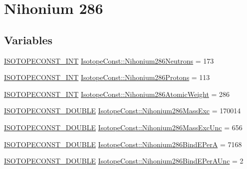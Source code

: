 \hypertarget{group___isotope_const-_nihonium-_nh286}{}\section{Nihonium 286}
\label{group___isotope_const-_nihonium-_nh286}
\subsection*{Variables}
\begin{DoxyCompactItemize}
\item 
\mbox{\hyperlink{group___isotope_const-_macros_ga5f18360b3e99483a35c32d789e62621c}{I\+S\+O\+T\+O\+P\+E\+C\+O\+N\+S\+T\+\_\+\+I\+NT}} \mbox{\hyperlink{group___isotope_const-_nihonium-_nh286_gad570360409f83cc1f981cc12b510ae24}{Isotope\+Const\+::\+Nihonium286\+Neutrons}} = 173
\item 
\mbox{\hyperlink{group___isotope_const-_macros_ga5f18360b3e99483a35c32d789e62621c}{I\+S\+O\+T\+O\+P\+E\+C\+O\+N\+S\+T\+\_\+\+I\+NT}} \mbox{\hyperlink{group___isotope_const-_nihonium-_nh286_ga66933140166638545d1d9145b22dfb3d}{Isotope\+Const\+::\+Nihonium286\+Protons}} = 113
\item 
\mbox{\hyperlink{group___isotope_const-_macros_ga5f18360b3e99483a35c32d789e62621c}{I\+S\+O\+T\+O\+P\+E\+C\+O\+N\+S\+T\+\_\+\+I\+NT}} \mbox{\hyperlink{group___isotope_const-_nihonium-_nh286_ga3d76018d6b305dfa9ec1e5baef2e2f73}{Isotope\+Const\+::\+Nihonium286\+Atomic\+Weight}} = 286
\item 
\mbox{\hyperlink{group___isotope_const-_macros_ga8f45a7272ce02c0b4c65c44636ed719a}{I\+S\+O\+T\+O\+P\+E\+C\+O\+N\+S\+T\+\_\+\+D\+O\+U\+B\+LE}} \mbox{\hyperlink{group___isotope_const-_nihonium-_nh286_gab218f8ec302a8dac8239d16543ed7050}{Isotope\+Const\+::\+Nihonium286\+Mass\+Exc}} = 170014
\item 
\mbox{\hyperlink{group___isotope_const-_macros_ga8f45a7272ce02c0b4c65c44636ed719a}{I\+S\+O\+T\+O\+P\+E\+C\+O\+N\+S\+T\+\_\+\+D\+O\+U\+B\+LE}} \mbox{\hyperlink{group___isotope_const-_nihonium-_nh286_ga795030e9e6cb0050b7b0ef6985d8adda}{Isotope\+Const\+::\+Nihonium286\+Mass\+Exc\+Unc}} = 656
\item 
\mbox{\hyperlink{group___isotope_const-_macros_ga8f45a7272ce02c0b4c65c44636ed719a}{I\+S\+O\+T\+O\+P\+E\+C\+O\+N\+S\+T\+\_\+\+D\+O\+U\+B\+LE}} \mbox{\hyperlink{group___isotope_const-_nihonium-_nh286_gaa575922923cb4e97ac8e5efda8f19953}{Isotope\+Const\+::\+Nihonium286\+Bind\+E\+PerA}} = 7168
\item 
\mbox{\hyperlink{group___isotope_const-_macros_ga8f45a7272ce02c0b4c65c44636ed719a}{I\+S\+O\+T\+O\+P\+E\+C\+O\+N\+S\+T\+\_\+\+D\+O\+U\+B\+LE}} \mbox{\hyperlink{group___isotope_const-_nihonium-_nh286_ga698647df3ce7d2da23c114824145bca6}{Isotope\+Const\+::\+Nihonium286\+Bind\+E\+Per\+A\+Unc}} = 2

\end{DoxyCompactItemize}
